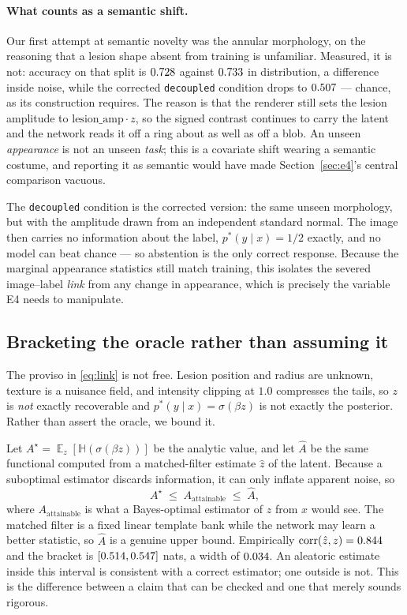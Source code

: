 \documentclass{article}
\DeclareMathOperator*{\E}{\mathbb{E}}
\newcommand{\Hent}{\mathbb{H}}
\begin{document}
\paragraph{What counts as a semantic shift.} Our first attempt at semantic
novelty was the annular morphology, on the reasoning that a lesion shape absent
from training is unfamiliar. Measured, it is not: accuracy on that split is
$0.728$ against $0.733$ in distribution, a difference inside noise, while
the corrected \texttt{decoupled} condition drops to $0.507$ --- chance,
as its construction requires. The reason is
that the renderer still sets the lesion amplitude to $\mathrm{lesion\_amp}\cdot z$,
so the signed contrast continues to carry the latent and the network reads it off
a ring about as well as off a blob. An unseen \emph{appearance} is not an unseen
\emph{task}; this is a covariate shift wearing a semantic costume, and reporting
it as semantic would have made Section~\ref{sec:e4}'s central comparison
vacuous.

The \texttt{decoupled} condition is the corrected version: the same unseen
morphology, but with the amplitude drawn from an independent standard normal.
The image then carries no information about the label, $p^*(y\mid x) = 1/2$
exactly, and no model can beat chance --- so abstention is the only correct
response. Because the marginal appearance statistics still match training, this
isolates the severed image--label \emph{link} from any change in appearance,
which is precisely the variable E4 needs to manipulate.

\subsection{Bracketing the oracle rather than assuming it}
\label{sec:bracket}

The proviso in \eqref{eq:link} is not free. Lesion position and radius are
unknown, texture is a nuisance field, and intensity clipping at $1.0$ compresses
the tails, so $z$ is \emph{not} exactly recoverable and $p^*(y\mid x) = \sigma(\beta z)$
is not exactly the posterior. Rather than assert the oracle, we bound it.

Let $A^\star = \E_z[\Hent(\sigma(\beta z))]$ be the analytic value, and let
$\hat{A}$ be the same functional computed from a matched-filter estimate
$\hat{z}$ of the latent. Because a suboptimal estimator discards information, it
can only inflate apparent noise, so
\begin{equation}
A^\star \;\le\; A_{\text{attainable}} \;\le\; \hat{A},
\end{equation}
where $A_{\text{attainable}}$ is what a Bayes-optimal estimator of $z$ from $x$
would see. The matched filter is a fixed linear template bank while the network
may learn a better statistic, so $\hat{A}$ is a genuine upper bound. Empirically
$\mathrm{corr}(\hat z, z) = 0.844$ and the bracket is
$[0.514, 0.547]$ nats, a width of $0.034$. An aleatoric
estimate inside this interval is consistent with a correct estimator; one outside
is not. This is the difference between a claim that can be checked and one that
merely sounds rigorous.
\end{document}
